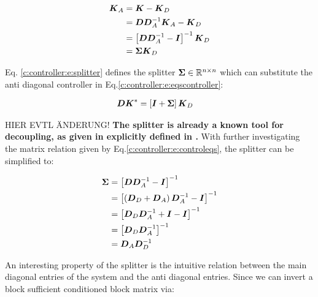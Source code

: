 \begin{align}
\begin{split}
\mbox{\boldmath$K$}_A &= \mbox{\boldmath$K$} - \mbox{\boldmath$K$}_D \\
&= \mbox{\boldmath$D$}\mbox{\boldmath$D$}_A^{-1} \mbox{\boldmath$K$}_A - \mbox{\boldmath$K$}_D \\
&= \left[\mbox{\boldmath$D$}\mbox{\boldmath$D$}_A^{-1} - \mbox{\boldmath$I$}  \right]^{-1} \mbox{\boldmath$K$}_D\\
&= \mbox{\boldmath$\Sigma$} \mbox{\boldmath$K$}_D
\end{split}
\label{c:controller:e:splitter}
\end{align}

Eq. \ref{c:controller:e:splitter} defines the splitter $\mbox{\boldmath$\Sigma$} \in \mathbb{R}^{n \times n}$ which can substitute the anti diagonal controller in Eq.\ref{c:controller:e:eqscontroller}:

\begin{align}
\begin{split}
\mbox{\boldmath$D$} \mbox{\boldmath$K$}^* &= \left[ \mbox{\boldmath$I$} + \mbox{\boldmath$\Sigma$} \right] \mbox{\boldmath$K$}_D
\end{split}
\label{c:controller:e:controleqs}
\end{align}

HIER EVTL ÄNDERUNG! \textbf{The splitter is already a known tool for decoupling, as given in \cite[p.190 ff.]{Wang2006} explicitly defined in \cite[p.193 Eq.(6.19)]{Wang2006}.} With further investigating the matrix relation given by Eq.\ref{c:controller:e:controleqs}, the splitter can be simplified to:

\begin{align*}
\begin{split}
\mbox{\boldmath$\Sigma$} &= \left[\mbox{\boldmath$D$}\mbox{\boldmath$D$}_A^{-1} - \mbox{\boldmath$I$}  \right]^{-1} \\
&= \left[\left(\mbox{\boldmath$D$}_D + \mbox{\boldmath$D$}_A\right)\mbox{\boldmath$D$}_A^{-1} - \mbox{\boldmath$I$}  \right]^{-1} \\
&= \left[\mbox{\boldmath$D$}_D \mbox{\boldmath$D$}_A^{-1} + \mbox{\boldmath$I$} - \mbox{\boldmath$I$}  \right]^{-1}\\
&= \left[\mbox{\boldmath$D$}_D \mbox{\boldmath$D$}_A^{-1}\right]^{-1}\\
&= \mbox{\boldmath$D$}_A \mbox{\boldmath$D$}_D^{-1}\\
\end{split}
\end{align*}


An interesting property of the splitter is the intuitive relation between the main diagonal entries of the system and the anti diagonal entries. Since we can invert a block sufficient conditioned block matrix via:

